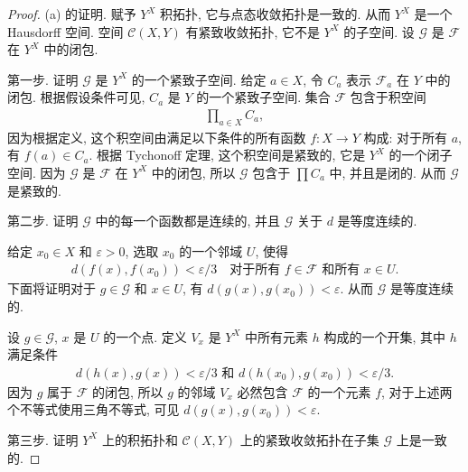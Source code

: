 \documentclass[../../main.tex]{subfiles}
\begin{document}
\begin{proof}
(a) 的证明. 赋予 $Y^X$ 积拓扑, 它与点态收敛拓扑是一致的. 从而 $Y^X$ 是一个 Hausdorff 空间. 空间 $\mathcal{C}(X,Y)$ 有紧致收敛拓扑, 它不是 $Y^X$ 的子空间. 设 $\mathcal{G}$ 是 $\mathcal{F}$ 在 $Y^X$ 中的闭包.

第一步. 证明 $\mathcal{G}$ 是 $Y^X$ 的一个紧致子空间. 给定 $a\in X$, 令 $C_a$ 表示 $\mathcal{F}_a$ 在 $Y$ 中的闭包. 根据假设条件可见, $C_a$ 是 $Y$ 的一个紧致子空间. 集合 $\mathcal{F}$ 包含于积空间
\begin{align*}
\prod_{a\in X} C_a,
\end{align*}
因为根据定义, 这个积空间由满足以下条件的所有函数 $f\colon X\to Y$ 构成: 对于所有 $a$, 有 $f(a)\in C_a$. 根据 Tychonoff 定理, 这个积空间是紧致的, 它是 $Y^X$ 的一个闭子空间. 因为 $\mathcal{G}$ 是 $\mathcal{F}$ 在 $Y^X$ 中的闭包, 所以 $\mathcal{G}$ 包含于 $\prod C_a$ 中, 并且是闭的. 从而 $\mathcal{G}$ 是紧致的.

第二步. 证明 $\mathcal{G}$ 中的每一个函数都是连续的, 并且 $\mathcal{G}$ 关于 $d$ 是等度连续的.

给定 $x_0\in X$ 和 $\varepsilon>0$, 选取 $x_0$ 的一个邻域 $U$, 使得
\begin{align*}
d(f(x),f(x_0))<\varepsilon/3\quad\text{对于所有 }f\in\mathcal{F}\text{ 和所有 }x\in U.
\end{align*}
下面将证明对于 $g\in\mathcal{G}$ 和 $x\in U$, 有 $d(g(x),g(x_0))<\varepsilon$. 从而 $\mathcal{G}$ 是等度连续的.

设 $g\in\mathcal{G}$, $x$ 是 $U$ 的一个点. 定义 $V_x$ 是 $Y^X$ 中所有元素 $h$ 构成的一个开集, 其中 $h$ 满足条件
\begin{align*}
d(h(x),g(x))<\varepsilon/3\text{ 和 }d(h(x_0),g(x_0))<\varepsilon/3.
\end{align*}
因为 $g$ 属于 $\mathcal{F}$ 的闭包, 所以 $g$ 的邻域 $V_x$ 必然包含 $\mathcal{F}$ 的一个元素 $f$, 对于上述两个不等式使用三角不等式, 可见 $d(g(x),g(x_0))<\varepsilon$.

第三步. 证明 $Y^X$ 上的积拓扑和 $\mathcal{C}(X,Y)$ 上的紧致收敛拓扑在子集 $\mathcal{G}$ 上是一致的.


\end{proof}
\end{document}
